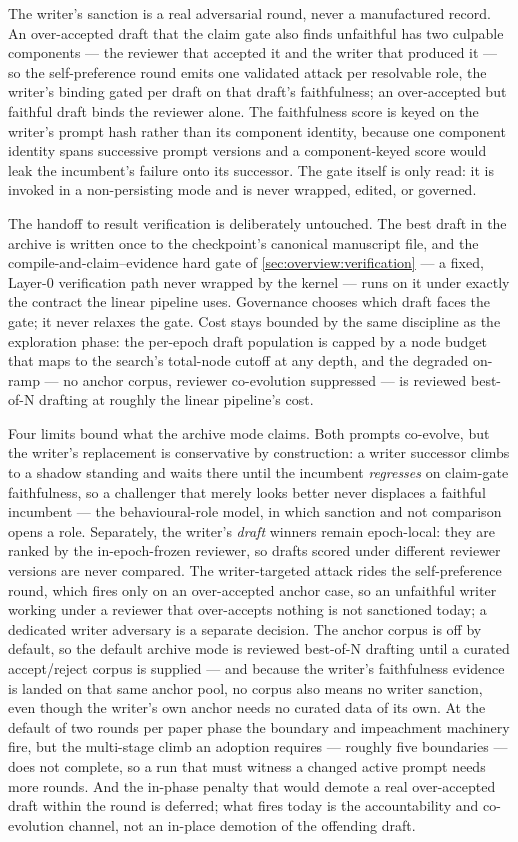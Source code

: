 The writer's sanction is a real adversarial round, never a manufactured
record. An over-accepted draft that the claim gate also finds unfaithful
has two culpable components --- the reviewer that accepted it and the
writer that produced it --- so the self-preference round emits one
validated attack per resolvable role, the writer's binding gated per draft
on that draft's faithfulness; an over-accepted but faithful draft binds
the reviewer alone. The faithfulness score is keyed on the writer's prompt
hash rather than its component identity, because one component identity
spans successive prompt versions and a component-keyed score would leak
the incumbent's failure onto its successor. The gate itself is only read:
it is invoked in a non-persisting mode and is never wrapped, edited, or
governed.

The handoff to result verification is deliberately untouched. The best
draft in the archive is written once to the checkpoint's canonical
manuscript file, and the compile-and-claim--evidence hard gate of
\cref{sec:overview:verification} --- a fixed, Layer-0 verification path never
wrapped by the kernel --- runs on it under exactly the contract the
linear pipeline uses. Governance chooses which draft faces the gate; it
never relaxes the gate. Cost stays bounded by the same discipline as the
exploration phase: the per-epoch draft population is capped by a node
budget that maps to the search's total-node cutoff at any depth, and the
degraded on-ramp --- no anchor corpus, reviewer co-evolution suppressed
--- is reviewed best-of-N drafting at roughly the linear pipeline's cost.

Four limits bound what the archive mode claims. Both prompts co-evolve,
but the writer's replacement is conservative by construction: a writer
successor climbs to a shadow standing and waits there until the incumbent
\emph{regresses} on claim-gate faithfulness, so a challenger that merely
looks better never displaces a faithful incumbent --- the behavioural-role
model, in which sanction and not comparison opens a role. Separately, the
writer's \emph{draft} winners remain epoch-local: they are ranked by the
in-epoch-frozen reviewer, so drafts scored under different reviewer
versions are never compared. The writer-targeted attack rides the
self-preference round, which fires only on an over-accepted anchor case,
so an unfaithful writer working under a reviewer that over-accepts nothing
is not sanctioned today; a dedicated writer adversary is a separate
decision. The anchor corpus is off by default, so the default archive mode
is reviewed best-of-N drafting until a curated accept/reject corpus is
supplied --- and because the writer's faithfulness evidence is landed on
that same anchor pool, no corpus also means no writer sanction, even
though the writer's own anchor needs no curated data of its own. At the
default of two rounds per paper phase the boundary and impeachment
machinery fire, but the multi-stage climb an adoption requires ---
roughly five boundaries --- does not complete, so a run that must witness a
changed active prompt needs more rounds. And the in-phase penalty
that would demote a real over-accepted draft within the round is
deferred; what fires today is the accountability and co-evolution
channel, not an in-place demotion of the offending draft.

